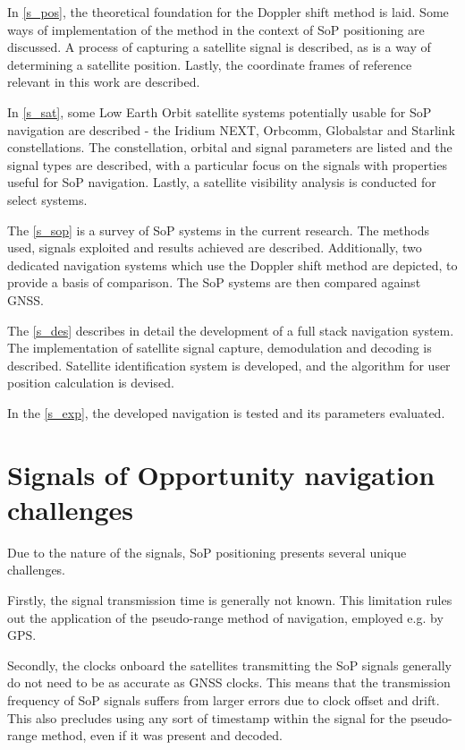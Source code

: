 In \autoref{s_pos}, the theoretical foundation for the Doppler shift method is laid. Some ways of implementation of the method in the context of SoP positioning are discussed. A process of capturing a satellite signal is described, as is a way of determining a satellite position. Lastly, the coordinate frames of reference relevant in this work are described.

In \autoref{s_sat}, some Low Earth Orbit satellite systems potentially usable for SoP navigation are described - the Iridium NEXT, Orbcomm, Globalstar and Starlink constellations. The constellation, orbital and signal parameters are listed and the signal types are described, with a particular focus on the signals with properties useful for SoP navigation. Lastly, a satellite visibility analysis is conducted for select systems.

The \autoref{s_sop} is a survey of SoP systems in the current research. The methods used, signals exploited and results achieved are described. Additionally, two dedicated navigation systems which use the Doppler shift method are depicted, to provide a basis of comparison. The SoP systems are then compared against GNSS.

The \autoref{s_des} describes in detail the development of a full stack navigation system. The implementation of satellite signal capture, demodulation and decoding is described. Satellite identification system is developed, and the algorithm for user position calculation is devised.

In the \autoref{s_exp}, the developed navigation is tested and its parameters evaluated.

\section{Signals of Opportunity navigation challenges}
Due to the nature of the signals, SoP positioning presents several unique challenges.

Firstly, the signal transmission time is generally not known. This limitation rules out the application of the pseudo-range method of navigation, employed e.g. by GPS.

Secondly, the clocks onboard the satellites transmitting the SoP signals generally do not need to be as accurate as GNSS clocks. This means that the transmission frequency of SoP signals suffers from larger errors due to clock offset and drift. This also precludes using any sort of timestamp within the signal for the pseudo-range method, even if it was present and decoded.

